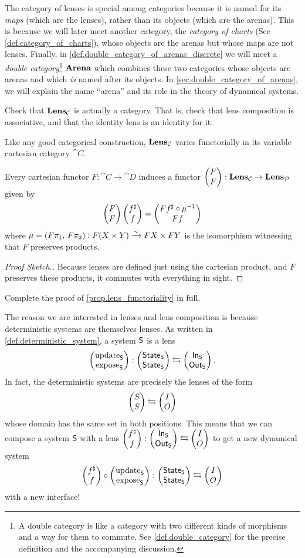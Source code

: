 \documentclass[DynamicalBook]{subfiles}
\begin{document}
\begin{remark}
  The category of lenses is special among categories because it is named for its
  \emph{maps} (which are the lenses), rather than its objects (which are the
  arenas). This is because we will later meet another category, the
  \emph{category of charts} (See \cref{def.category_of_charts}), whose objects are
  the arenas but whose maps are not lenses. Finally, in
  \cref{def.double_category_of_arenas_discrete} we will meet a \emph{double
    category}\footnote{A double category is like a category with two different
    kinds of morphisms and a way for them to commute. See
    \cref{def.double_category} for the precise definition and the accompanying
    discussion.} $\textbf{Arena}$ which combines these two categories whose objects
  are arenas and which \emph{is} named after its objects. In
  \cref{sec.double_category_of_arenas}, we will explain the name ``arena'' and
  its role in the theory of dynamical systems.
\end{remark}

\begin{exercise}
  Check that $\textbf{Lens}_{\mathcal{C}}$ is actually a category. That is, check that
  lens composition is associative, and that the identity lens is an identity for it.
\end{exercise}

Like any good categorical construction, $\textbf{Lens}_{\mathcal{C}}$ varies
functorially in its variable cartesian category $\cat{C}$.
\begin{proposition}\label{prop.lens_functoriality}
  Every cartesian functor $F : \cat{C} \to \cat{D}$ induces a functor
  $\begin{pmatrix}{F} \\ {F} \end{pmatrix} : \textbf{Lens}_{\mathcal{C}} \to \textbf{Lens}_{\mathcal{D}}$ given by
  $$\begin{pmatrix}{F} \\ {F} \end{pmatrix}\begin{pmatrix}{f^{\sharp}} \\ {f} \end{pmatrix} = \begin{pmatrix}{Ff^{\sharp} \circ \mu^{-1}} \\ {Ff} \end{pmatrix}$$
  where $\mu = (F\pi_1,\, F\pi_2) : F(X \times Y) \xrightarrow{\sim} FX \times FY$ is
  the isomorphism witnessing that $F$ preserves products.
\end{proposition}
\begin{proof}[Proof Sketch.]
  Because lenses are defined just using the cartesian product, and $F$ preserves
  these products, it commutes with everything in sight.
\end{proof}

\begin{exercise}
  Complete the proof of \cref{prop.lens_functoriality} in full. 
\end{exercise}

The reason we are interested in lenses and lens composition is because
deterministic systems are themselves lenses. As written in
\cref{def.deterministic_system}, a system $\mathsf{S}$ is a lens
$$\begin{pmatrix}{\mathrm{update}_{\mathsf{S}}} \\ {\mathrm{expose}_{\mathsf{S}}} \end{pmatrix} : \begin{pmatrix}{\mathsf{State}_{\mathsf{S}}} \\ {\mathsf{State}_{\mathsf{S}}} \end{pmatrix} \leftrightarrows \begin{pmatrix}{\mathsf{In}_{\mathsf{S}}} \\ {\mathsf{Out}_{\mathsf{S}}} \end{pmatrix}.$$
In fact, the deterministic systems are precisely the lenses of the form
$$\begin{pmatrix}{S} \\ {S} \end{pmatrix} \leftrightarrows \begin{pmatrix}{I} \\ {O} \end{pmatrix}$$
whose domain has the same set in both positions. This means that we can compose
a system $\mathsf{S}$ with a lens $\begin{pmatrix}{f^{\sharp}} \\ {f} \end{pmatrix} : \begin{pmatrix}{\mathsf{In}_{\mathsf{S}}} \\ {\mathsf{Out}_{\mathsf{S}}} \end{pmatrix}
\leftrightarrows \begin{pmatrix}{I} \\ {O} \end{pmatrix}$ to get a new dynamical system
$$\begin{pmatrix}{f^{\sharp}} \\ {f} \end{pmatrix} \circ \begin{pmatrix}{\mathrm{update}_{\mathsf{S}}} \\ {\mathrm{expose}_{\mathsf{S}}} \end{pmatrix} :
\begin{pmatrix}{\mathsf{State}_{\mathsf{S}}} \\ {\mathsf{State}_{\mathsf{S}}} \end{pmatrix} \leftrightarrows \begin{pmatrix}{I} \\ {O} \end{pmatrix}$$
with a new interface!
\end{document}
